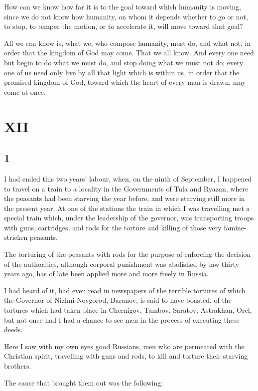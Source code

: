 \documentclass{book}
\begin{document}
How can we know how far it is to the goal toward which humanity is moving, since we do not know how humanity, on whom it depends whether to go or not, to stop, to temper the motion, or to accelerate it, will move toward that goal?

All we can know is, what we, who compose humanity, must do, and what not, in order that the kingdom of God may come. That we all know. And every one need but begin to do what we must do, and stop doing what we must not do; every one of us need only live by all that light which is within us, in order that the promised kingdom of God, toward which the heart of every man is drawn, may come at once.

\chapter*{XII}
\label{chapter-12}
\section*{1}
I had ended this two years’ labour, when, on the ninth of September, I happened to travel on a train to a locality in the Governments of Tula and Ryazan, where the peasants had been starving the year before, and were starving still more in the present year. At one of the stations the train in which I was travelling met a special train which, under the leadership of the governor, was transporting troops with guns, cartridges, and rods for the torture and killing of those very famine-stricken peasants.

The torturing of the peasants with rods for the purpose of enforcing the decision of the authorities, although corporal punishment was abolished by law thirty years ago, has of late been applied more and more freely in Russia.

I had heard of it, had even read in newspapers of the terrible tortures of which the Governor of Nizhni-Novgorod, Baranov, is said to have boasted, of the tortures which had taken place in Chernigov, Tambov, Saratov, Astrakhan, Orel, but not once had I had a chance to see men in the process of executing these deeds.

Here I saw with my own eyes good Russians, men who are permeated with the Christian spirit, travelling with guns and rods, to kill and torture their starving brothers.

The cause that brought them out was the following:
\end{document}
